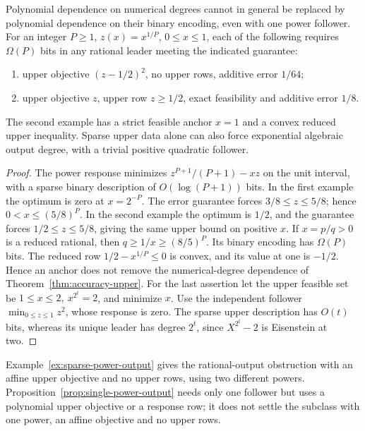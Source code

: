 \begin{samepage}
\begin{proposition}
\label{prop:single-power-output}
Polynomial dependence on numerical degrees cannot in general be replaced by
polynomial dependence on their binary encoding, even with one power follower.
For an integer \(P\ge1\), \(z(x)=x^{1/P}\), \(0\le x\le1\), each of the following requires
\(\Omega(P)\) bits in any rational leader meeting the indicated guarantee:
\begin{enumerate}
\item upper objective \((z-1/2)^2\), no upper rows, additive error \(1/64\);
\item upper objective \(z\), upper row \(z\ge1/2\), exact feasibility and
additive error \(1/8\).
\end{enumerate}
The second example has a strict feasible anchor \(x=1\) and a convex reduced
upper inequality. Sparse upper data alone can also force exponential algebraic
output degree, with a trivial positive quadratic follower.
\end{proposition}
\end{samepage}
\begin{proof}
The power response minimizes \(z^{P+1}/(P+1)-xz\) on the unit interval,
with a sparse binary description of \(O(\log(P+1))\) bits.
In the first example the optimum is zero at \(x=2^{-P}\). The error guarantee
forces \(3/8\le z\le5/8\); hence \(0<x\le(5/8)^P\). In the second example
the optimum is \(1/2\), and the guarantee forces \(1/2\le z\le5/8\), giving
the same upper bound on positive \(x\). If \(x=p/q>0\) is a reduced rational,
then \(q\ge1/x\ge(8/5)^P\). Its binary encoding has \(\Omega(P)\) bits.
The reduced row \(1/2-x^{1/P}\le0\) is convex, and its value at one is
\(-1/2\). Hence an anchor does not remove the numerical-degree dependence of
Theorem~\ref{thm:accuracy-upper}.
For the last assertion let the upper feasible set be
\(1\le x\le2,\ x^{2^t}=2\), and minimize \(x\). Use the independent follower
\(\min_{0\le z\le1}z^2\), whose response is zero. The sparse upper description
has \(O(t)\) bits, whereas its unique leader has degree \(2^t\), since
\(X^{2^t}-2\) is Eisenstein at two.
\end{proof}
Example~\ref{ex:sparse-power-output} gives the rational-output obstruction
with an affine upper objective and no upper rows, using two different powers.
Proposition~\ref{prop:single-power-output} needs only one follower but uses a
polynomial upper objective or a response row; it does not settle the subclass
with one power, an affine objective and no upper rows.

